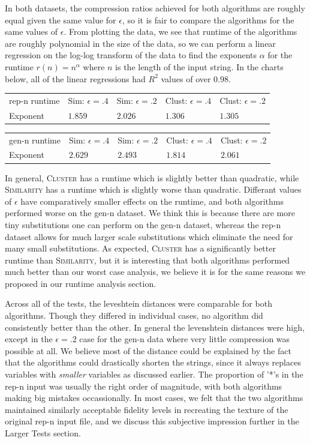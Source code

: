 \documentclass[11pt]{article}
\newcommand{\Similarity}{\textsc{Similarity}\xspace}
\newcommand{\Cluster}{\textsc{Cluster}\xspace}
\begin{document}
In both datasets, the 
compression ratios achieved for both algorithms are roughly equal given the
same value for $\epsilon$, so it is fair to compare the algorithms for the same
values of $\epsilon$. 
From plotting the data, we see that runtime of the algorithms are roughly
polynomial in the size of the data, so we can perform a linear regression on
the log-log transform of the data to find the exponents $\alpha$ for the
runtime $r(n)=n^\alpha$ where $n$ is the length of the input string. In the
charts below, all of the linear regressions had $R^2$ values of over $0.98$.

\begin{tabular}{l|l|l|l|l}
rep-n runtime & Sim: $\epsilon=.4$ & Sim: $\epsilon=.2$ & Clust: $\epsilon = .4$ & Clust: $\epsilon = .2$ \\
Exponent      & $1.859$ & $2.026$ & $1.306$ & $1.305$
\end{tabular}

\begin{tabular}{l|l|l|l|l}
gen-n runtime & Sim: $\epsilon=.4$ & Sim: $\epsilon=.2$ & Clust: $\epsilon = .4$ & Clust: $\epsilon = .2$ \\
Exponent      & $2.629$ & $2.493$ & $1.814$ & $2.061$
\end{tabular}

In general, \Cluster has a runtime which is slightly better than quadratic,
while \Similarity has a runtime which is slightly worse than quadratic.
Differant values of $\epsilon$ have comparatively smaller effects on the
runtime, and both algorithms performed worse on the gen-n dataset. We think
this is because there are more tiny substitutions one can perform on
the gen-n dataset, whereas the rep-n dataset allows for much larger scale
substitutions which eliminate the need for many small substitutions.
As expected, \Cluster has a significantly better runtime than \Similarity,
but it is interesting that both algorithms performed much better than our
worst case analysis, we believe it is for the same reasons we proposed
in our runtime analysis section.


Across all of the tests, the leveshtein
distances were comparable for both algorithms. Though they differed in
individual cases, no algorithm did consistently better than the other.
In general the levenshtein distances were high, except in the $\epsilon=.2$
case for the gen-n data where very little compression was possible at all.
We believe most of the distance could be explained by
the fact that the algorithms could drastically shorten
the strings, since it always replaces variables with \emph{smaller} variables
as discussed earlier.
The proportion of '*'s in the rep-n input
was usually the right order of magnitude, with both algorithms making big
mistakes occassionally. In most cases, we felt that the two algorithms maintained similarly
acceptable fidelity levels in recreating the texture of the original rep-n
input file, and we discuss this subjective impression further in the
Larger Tests section.
\end{document}
